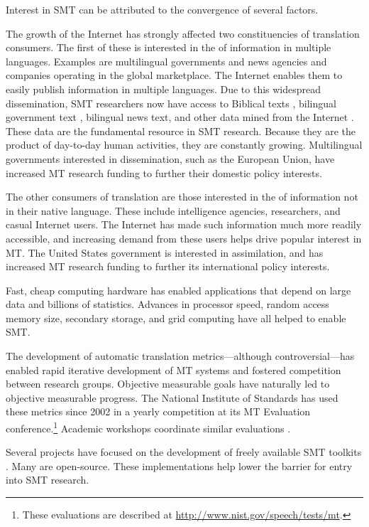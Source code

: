 Interest in SMT can be attributed to the convergence of
several factors.

\begin{asparaenum}
\item The growth of the Internet has strongly affected
two constituencies of translation consumers.  The first 
of these is interested in the 
of information in multiple languages.  Examples are multilingual
governments and news agencies and companies
operating in the global marketplace.  The Internet enables them
to easily publish information in multiple languages.
Due to this widespread dissemination, SMT researchers 
now have access to Biblical texts \citep{Resnik:1997:tei}, 
bilingual government text \citep{Koehn:2005:mtsummit}, 
bilingual news text, and
other data mined from the Internet \citep{Resnik:2003:cl}.
These data are the fundamental resource in SMT research. 
Because they are the product of day-to-day human activities,
they are constantly growing.  Multilingual governments 
interested in dissemination, such as the European Union,
have increased MT research funding to further
their domestic policy interests.

\item The other consumers of translation are those
interested in the  of information not in their
native language.  These include intelligence agencies, researchers,
and casual Internet users.  The Internet has made such information
much more readily accessible, and
increasing demand from these users helps drive popular interest in MT.
The United States government is interested in
assimilation, and has increased MT research funding
to further its international policy interests.

\item Fast, cheap computing hardware has enabled applications
that depend on large data and billions of statistics.
Advances in processor speed, random access memory 
size, secondary storage, and
grid computing have all helped to enable SMT.

\item The development of automatic translation 
metrics---although controversial---has
enabled rapid iterative development of MT systems and 
fostered competition between research groups.  Objective
measurable goals have naturally led to objective
measurable progress.  The National Institute of Standards
has used these metrics since 2002 in a yearly competition at its
MT Evaluation conference.\footnote{These evaluations
are described at \url{http://www.nist.gov/speech/tests/mt}.}
Academic workshops coordinate similar evaluations
\citep{Koehn:2005:wpt,Koehn:2006:smt,Callison-Burch:2007:smt}.

\item Several projects have focused on the development
of freely available SMT toolkits
\citep{Al-Onaizan:1999:tr,Germann:2001:acl,Och:2003:cl,Koehn:2004:amta,Burbank:2005:tr,Olteanu:2006:smt,Koehn:2007:acl-demo}.
Many are open-source.  These implementations help lower the barrier for entry
into SMT research.
\end{asparaenum}

